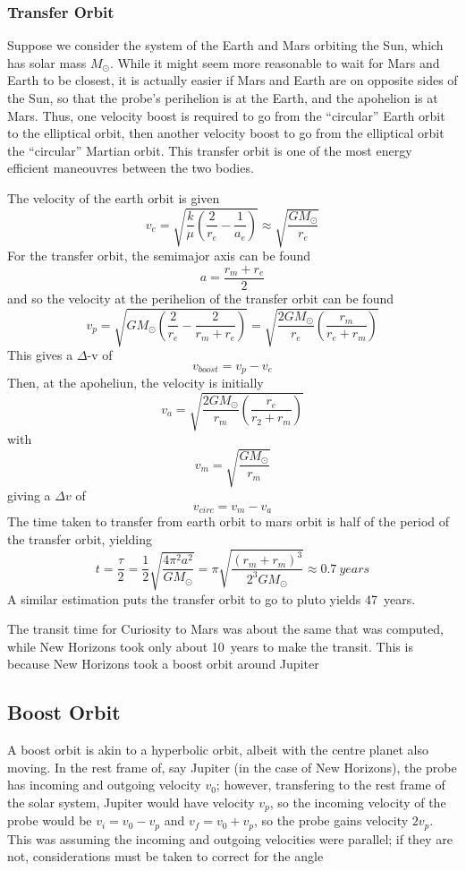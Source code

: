 \subsubsection{Transfer Orbit}
Suppose we consider the system of the Earth and Mars orbiting the Sun, which has solar mass \(M_\odot\). While it might seem more reasonable to wait for Mars and Earth to be closest, it is actually easier if Mars and Earth are on opposite sides of the Sun, so that the probe's perihelion is at the Earth, and the apohelion is at Mars. Thus, one velocity boost is required to go from the ``circular'' Earth orbit to the elliptical orbit, then another velocity boost to go from the elliptical orbit the ``circular'' Martian orbit. This transfer orbit is one of the most energy efficient maneouvres between the two bodies.

The velocity of the earth orbit is given
\[v_e = \sqrt{\frac{k}{\mu}\left(\frac{2}{r_e}-\frac{1}{a_e}\right)}\approx\sqrt{\frac{GM_\odot}{r_e}}\]
For the transfer orbit, the semimajor axis can be found
\[a = \frac{r_m+r_e}{2}\]
and so the velocity at the perihelion of the transfer orbit can be found
\[v_p=\sqrt{GM_\odot\left(\frac{2}{r_e}-\frac{2}{r_m+r_e}\right)}=\sqrt{\frac{2GM_\odot}{r_e}\left(\frac{r_m}{r_e+r_m}\right)}\]
This gives a \(\Delta\)-v of 
\[v_{boost}=v_p-v_e\]
Then, at the apoheliun, the velocity is initially
\[v_a=\sqrt{\frac{2GM_\odot}{r_m}\left(\frac{r_e}{r_2+r_m}\right)}\]
with
\[v_m=\sqrt{\frac{GM_\odot}{r_m}}\]
giving a \(\Delta v\) of 
\[v_{circ}=v_m-v_a\]
The time taken to transfer from earth orbit to mars orbit is half of the period of the transfer orbit, yielding
\[t= \frac{\tau}{2}=\frac{1}{2}\sqrt{\frac{4\pi^2 a^2}{GM_\odot}} = \pi\sqrt{\frac{(r_m+r_m)^3}{2^3GM_\odot}}\approx \SI{0.7}{years}\]
A similar estimation puts the transfer orbit to go to pluto yields \SI{47}{years}.

The transit time for Curiosity to Mars was about the same that was computed, while New Horizons took only about \SI{10}{years} to make the transit. This is because New Horizons took a boost orbit around Jupiter

\subsection{Boost Orbit}
A boost orbit is akin to a hyperbolic orbit, albeit with the centre planet also moving. In the rest frame of, say Jupiter (in the case of New Horizons), the probe has incoming and outgoing velocity \(v_0\); however, transfering to the rest frame of the solar system, Jupiter would have velocity \(v_p\), so the incoming velocity of the probe would be \(v_i = v_0-v_p\) and \(v_f = v_0+v_p\), so the probe gains velocity \(2v_p\). This was assuming the incoming and outgoing velocities were parallel; if they are not, considerations must be taken to correct for the angle

